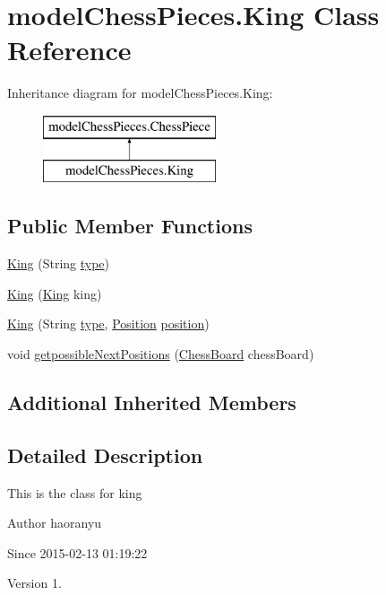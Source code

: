 \hypertarget{classmodel_chess_pieces_1_1_king}{\section{model\+Chess\+Pieces.\+King Class Reference}
\label{classmodel_chess_pieces_1_1_king}
}
Inheritance diagram for model\+Chess\+Pieces.\+King\+:\begin{figure}[H]
\begin{center}
\leavevmode
\includegraphics[height=2.000000cm]{classmodel_chess_pieces_1_1_king}
\end{center}
\end{figure}
\subsection*{Public Member Functions}
\begin{DoxyCompactItemize}
\item 
\hyperlink{classmodel_chess_pieces_1_1_king_addca0068eced10beccbb62407358e10a}{King} (String \hyperlink{classmodel_chess_pieces_1_1_chess_piece_a195487ca88c197af7c1604247be31db2}{type})
\item 
\hyperlink{classmodel_chess_pieces_1_1_king_a0ec90934d337912d33f74cc75547befd}{King} (\hyperlink{classmodel_chess_pieces_1_1_king}{King} king)
\item 
\hyperlink{classmodel_chess_pieces_1_1_king_a304e8f6364f887674d05a98e7a6f3ea1}{King} (String \hyperlink{classmodel_chess_pieces_1_1_chess_piece_a195487ca88c197af7c1604247be31db2}{type}, \hyperlink{classmodel_core_1_1_position}{Position} \hyperlink{classmodel_chess_pieces_1_1_chess_piece_a3d4362d5b28f6edb14161196d9c6807d}{position})
\item 
void \hyperlink{classmodel_chess_pieces_1_1_king_a2e7719a816495c0fae7188c3d96a2213}{getpossible\+Next\+Positions} (\hyperlink{classmodel_core_1_1_chess_board}{Chess\+Board} chess\+Board)
\end{DoxyCompactItemize}
\subsection*{Additional Inherited Members}


\subsection{Detailed Description}
This is the class for king \begin{DoxyAuthor}{Author}
haoranyu 
\end{DoxyAuthor}
\begin{DoxySince}{Since}
2015-\/02-\/13 01\+:19\+:22 
\end{DoxySince}
\begin{DoxyVersion}{Version}
1. 
\end{DoxyVersion}


